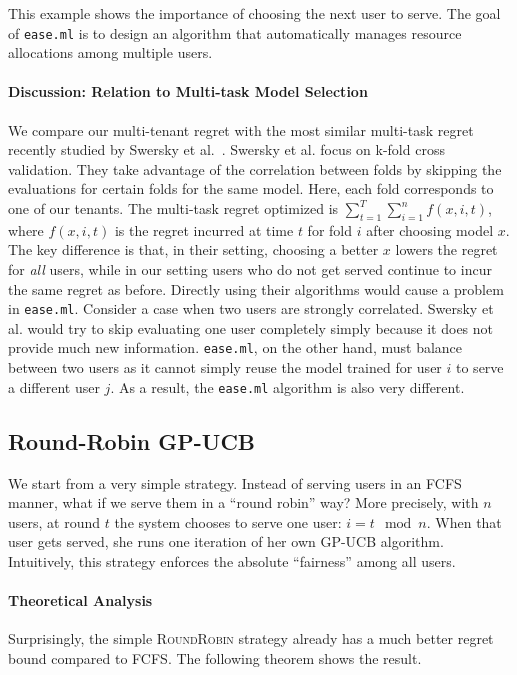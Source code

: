 \documentclass[letterpaper]{vldb}
\newcommand{\eml}{\texttt{ease.ml}\xspace}
\newcommand{\rr}{\textsc{RoundRobin}\xspace}
\begin{document}
\vspace{0.5em}
This example shows the importance of
choosing the next user to serve. The goal of
\eml is to design an algorithm
that automatically manages resource
allocations among multiple users.

\vspace{-0.5em}
\paragraph*{Discussion: Relation to 
Multi-task Model Selection}
We compare our multi-tenant
regret with the most similar multi-task
regret recently
studied by Swersky et al.~\cite{Swersky2013}.
Swersky et al. focus on 
k-fold cross validation. They 
take advantage of the correlation between
folds by skipping the evaluations for certain folds for the same model. Here, each fold corresponds to 
one of our tenants. The
multi-task regret optimized %
is $\sum_{t=1}^T \sum_{i=1}^n f(x, i, t)$,
where $f(x, i, t)$ is the regret incurred
at time $t$ for fold $i$ after choosing
model $x$. The key difference
is that, in their setting, choosing a
better $x$ lowers the regret for {\em all}
users, while in our setting users
who do not get served continue to incur 
the same regret as before. 
Directly using their algorithms would 
cause a problem in \eml. Consider
a case when two users are strongly correlated. Swersky et al. would try to 
skip evaluating one user completely
simply because it does not provide much new information. \eml, on the other hand, must 
balance between two users as it cannot 
simply reuse the model trained 
for user $i$ to serve a different user $j$.
As a result, the \eml algorithm is also very different.

\subsection{Round-Robin GP-UCB}

We start from a very simple strategy. Instead of
serving users in an FCFS manner, what if
we serve them in a ``round robin'' way?
More precisely, with $n$ users, 
at round $t$ the system
chooses to serve one user: $i = t \mod n$.
When that user gets served, she runs one
iteration of her own GP-UCB algorithm. 
Intuitively, this strategy enforces
the absolute ``fairness'' among all users.

\vspace{-0.5em}
\paragraph*{Theoretical Analysis}
Surprisingly, the simple \rr strategy already
has a much better regret bound compared
to FCFS. The following theorem shows
the result. 
\end{document}
